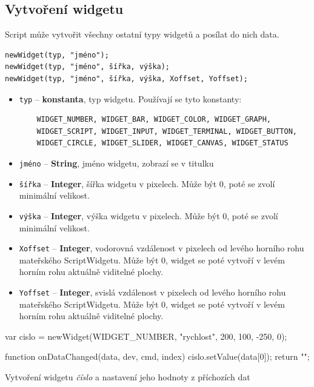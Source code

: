 \documentclass[12pt, a4paper, oneside]{article}
\newcommand{\It}{\textit}  %
\begin{document}
\subsection*{Vytvoření widgetu}

Script může vytvořit všechny ostatní typy widgetů a posílat do nich data. 
{\color{blue}
\begin{verbatim}newWidget(typ, "jméno");
newWidget(typ, "jméno", šířka, výška);
newWidget(typ, "jméno", šířka, výška, Xoffset, Yoffset);
\end{verbatim}
}

\begin{itemize}
    \item \verb|typ| -- {\bf konstanta}, typ widgetu. Používají se tyto konstanty:
    \begin{verbatim}
    WIDGET_NUMBER, WIDGET_BAR, WIDGET_COLOR, WIDGET_GRAPH,
    WIDGET_SCRIPT, WIDGET_INPUT, WIDGET_TERMINAL, WIDGET_BUTTON,
    WIDGET_CIRCLE, WIDGET_SLIDER, WIDGET_CANVAS, WIDGET_STATUS
    \end{verbatim}
    \item \verb/jméno/ -- {\bf String}, jméno widgetu, zobrazí se v titulku
    \item \verb/šířka/ -- {\bf Integer}, šířka widgetu v pixelech. Může být 0, poté se zvolí minimální velikost.
    \item \verb/výška/ -- {\bf Integer}, výška widgetu v pixelech. Může být 0, poté se zvolí minimální velikost.
    \item \verb/Xoffset/ -- {\bf Integer}, vodorovná vzdálenost v pixelech od levého horního rohu mateřského ScriptWidgetu. Může být 0, widget se poté vytvoří v levém horním rohu aktuálně viditelné plochy.
     \item \verb/Yoffset/ -- {\bf Integer}, svislá vzdálenost v pixelech od levého horního rohu mateřského ScriptWidgetu. Může být 0, widget se poté vytvoří v levém horním rohu aktuálně viditelné plochy.
\end{itemize}

\begin{listing}[H]
\begin{jscode}
var cislo = newWidget(WIDGET_NUMBER,
                "rychlost", 200, 100, -250, 0);

function onDataChanged(data, dev, cmd, index) {
    cislo.setValue(data[0]);
    return "";
}
\end{jscode}
\caption{Vytvoření widgetu \It{číslo} a nastavení jeho hodnoty z příchozích dat}
\end{listing}
\end{document}
